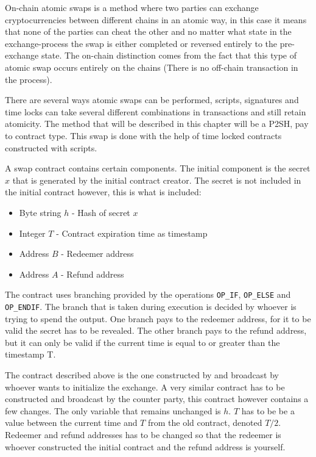 On-chain atomic swaps is a method where two parties can exchange cryptocurrencies between different chains in an atomic way, in this case it means that none of the parties can cheat the other and no matter what state in the exchange-process the swap is either completed or reversed entirely to the pre-exchange state. The on-chain distinction comes from the fact that this type of atomic swap occurs entirely on the chains (There is no off-chain transaction in the process).

There are several ways atomic swaps can be performed, scripts, signatures and time locks can take several different combinations in transactions and still retain atomicity. The method that will be described in this chapter will be a P2SH, pay to contract type. This swap is done with the help of time locked contracts constructed with scripts. 

A swap contract contains certain components. The initial component is the secret $x$ that is generated by the initial contract creator. The secret is not included in the initial contract however, this is what is included:
\begin{itemize}
	\item Byte string $h$ \quad - \quad Hash of secret $x$
	\item Integer $T$ \quad\quad - \quad Contract expiration time as timestamp
	\item Address $B$ \quad - \quad Redeemer address
	\item Address $A$ \quad - \quad Refund address
\end{itemize}

The contract uses branching provided by the operations \texttt{OP\_IF}, \texttt{OP\_ELSE} and \texttt{OP\_ENDIF}. The branch that is taken during execution is decided by whoever is trying to spend the output. One branch pays to the redeemer address, for it to be valid the secret has to be revealed. The other branch pays to the refund address, but it can only be valid if the current time is equal to or greater than the timestamp T.

The contract described above is the one constructed by and broadcast by whoever wants to initialize the exchange. A very similar contract has to be constructed and broadcast by the counter party, this contract however contains a few changes. The only variable that remains unchanged is $h$. $T$ has to be be a value between the current time and $T$ from the old contract, denoted $T/2$. Redeemer and refund addresses has to be changed so that the redeemer is whoever constructed the initial contract and the refund address is yourself.

